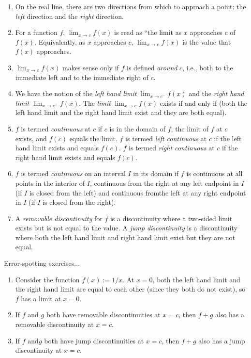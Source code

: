 \documentclass[10pt]{amsart}
\begin{document}
\begin{enumerate}

\item On the real line, there are two directions from which to
  approach a point: the {\em left} direction and the {\em right}
  direction.
\item For a function $f$, $\lim_{x \to c} f(x)$ is read as ``the limit
  as $x$ approaches $c$ of $f(x)$. Equivalently, as $x$ approaches
  $c$, $\lim_{x \to c} f(x)$ is the value that $f(x)$ approaches.
\item $\lim_{x \to c} f(x)$ makes sense only if $f$ is defined {\em
  around} $c$, i.e., both to the immediate left and to the immediate
  right of $c$.
\item We have the notion of the {\em left hand limit} $\lim_{x \to
  c^-} f(x)$ and the {\em right hand limit} $\lim_{x \to c^+}
  f(x)$. The {\em limit} $\lim_{x \to c} f(x)$ exists if and only if
  (both the left hand limit and the right hand limit exist and they are
  both equal).
\item $f$ is termed {\em continuous} at $c$ if $c$ is in the domain of
  $f$, the limit of $f$ at $c$ exists, and $f(c)$ equals the
  limit. $f$ is termed {\em left continuous} at $c$ if the left hand
  limit exists and equals $f(c)$. $f$ is termed {\em right continuous}
  at $c$ if the right hand limit exists and equals $f(c)$.
\item $f$ is termed {\em continuous} on an interval $I$ in its domain
  if $f$ is continuous at all points in the interior of $I$,
  continuous from the right at any left endpoint in $I$ (if $I$ is
  closed from the left) and continuous fromthe left at any right
  endpoint in $I$ (if $I$ is closed from the right).
\item A {\em removable discontinuity} for $f$ is a discontinuity where
  a two-sided limit exists but is not equal to the value. A {\em jump
  discontinuity} is a discontinuity where both the left hand limit and
  right hand limit exist but they are not equal.
\end{enumerate}

Error-spotting exercises...

\begin{enumerate}
\item Consider the function $f(x) := 1/x$. At $x = 0$, both the left
  hand limit and the right hand limit are equal to each other (since
  they both do not exist), so $f$ has a limit at $x = 0$.
\item If $f$ and $g$ both have removable discontinuities at $x = c$,
  then $f + g$ also has a removable discontinuity at $x = c$.
\item If $f$ and$g$ both have jump discontinuities at $x = c$, then $f
  + g$ also has a jump discontinuity at $x = c$.
\end{enumerate}
\end{document}
